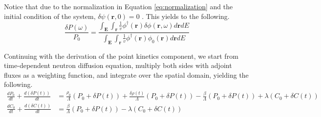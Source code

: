 Notice that due to the normalization in Equation \ref{eq:normalization} and the initial condition of the system, $\delta \psi(\textbf{r}, 0) = 0$ \cite{demaziereDevelopmentPointkineticVerification2017}. This yields to the following.
\begin{equation}
        \frac{ \delta P(\omega)}{P_0} = \frac{\int_{\textbf{E}} \int_{\textbf{r}} \frac{1}{v} \phi^{\dagger}(\textbf{r}) \delta \phi(\textbf{r}, \omega) d\textbf{r} dE}{\int_{\textbf{E}} \int_{\textbf{r}} \frac{1}{v} \phi^{\dagger}(\textbf{r}) \phi_0(\textbf{r}) d\textbf{r} dE}
\end{equation}

Continuing with the derivation of the point kinetics component, we start from time-dependent neutron diffusion equation, multiply both sides with adjoint fluxes as a weighting function, and integrate over the spatial domain, yielding the following.
\begin{equation}
    \begin{aligned}
        \frac{dP_0}{dt} + \frac{d(\delta P(t))}{dt} &= \frac{\rho_0}{\Lambda} (P_0 + \delta P(t)) + \frac{\delta \rho(t)}{\Lambda} (P_0 + \delta P(t)) - \frac{\beta}{\Lambda} (P_0 + \delta P(t)) + \lambda (C_0 + \delta C(t))\\
        \frac{dC_0}{dt} + \frac{d(\delta C(t))}{dt} &= \frac{\beta}{\Lambda} (P_0 + \delta P(t)) - \lambda (C_0 + \delta C(t))\\
    \end{aligned}
\end{equation}

